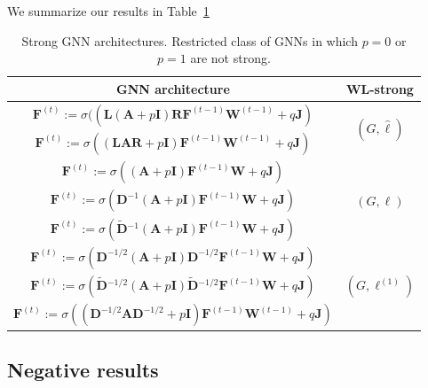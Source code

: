 We summarize our results in Table~\ref{tbl:strongGNN}
\begin{table}
	\centering
\begin{tabular}{|c|c|}\hline
	GNN architecture &  WL-strong\\\hline\hline
$\mathbf{F}^{(t)}:=\sigma((\mathbf{L}(\mathbf{A}+p\mathbf{I})\mathbf{R}\mathbf{F}^{(t-1)}\mathbf{W}^{(t-1)}+q\mathbf{J})$ & \multirow{2}{*}{$(G,\hat{\pmb{\ell}})$} \\
$\mathbf{F}^{(t)}:=\sigma\left((\mathbf{L}\mathbf{A}\mathbf{R}+p\mathbf{I})\mathbf{F}^{(t-1)}\mathbf{W}^{(t-1)} + q\mathbf{J}\right)$ & 
\\\hline
$\mathbf{F}^{(t)}:=\sigma((\mathbf{A}+p\mathbf{I})\mathbf{F}^{(t-1)}\mathbf{W}+q\mathbf{J})$ & \multirow{3}{*}{$(G,\pmb{\ell})$}\\
$\mathbf{F}^{(t)}:=\sigma(\mathbf{D}^{-1}(\mathbf{A}+p\mathbf{I})\mathbf{F}^{(t-1)}\mathbf{W}+q\mathbf{J})$ & \\
$\mathbf{F}^{(t)}:=\sigma(\tilde{\mathbf{D}}{}^{-1}(\mathbf{A}+p\mathbf{I})\mathbf{F}^{(t-1)}\mathbf{W}+q\mathbf{J})$ & \\\hline
$\mathbf{F}^{(t)}:=\sigma(\mathbf{D}^{-1/2}(\mathbf{A}+p\mathbf{I})\mathbf{D}^{-1/2}\mathbf{F}^{(t-1)}\mathbf{W}+q\mathbf{J})$ & \multirow{3}{*}{$(G,\pmb{\ell}^{(1)})$}\\
$\mathbf{F}^{(t)}:=\sigma(\tilde{\mathbf{D}}{}^{-1/2}(\mathbf{A}+p\mathbf{I})\tilde{\mathbf{D}}{}^{-1/2}\mathbf{F}^{(t-1)}\mathbf{W}+q\mathbf{J})$ & \\
$\mathbf{F}^{(t)}:=\sigma((\mathbf{D}^{-1/2}\mathbf{A}\mathbf{D}^{-1/2}+p\mathbf{I})\mathbf{F}^{(t-1)}\mathbf{W}^{(t-1)}+q\mathbf{J})$ & \\\hline
\end{tabular}
\caption{Strong GNN architectures. Restricted class of GNNs in which $p=0$ or $p=1$ are not strong. }\label{tbl:strongGNN}	
\end{table}


\subsection{Negative results}

